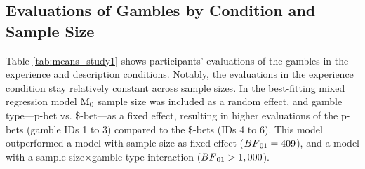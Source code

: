 \documentclass[a4paper, man, floatsintext]{apa6}
\title{}
\author{Jana B. Jarecki}
\date{02 Oktober, 2019}
\begin{document}
\subsection{Evaluations of Gambles by Condition and Sample Size}

Table \ref{tab:means_study1} shows participants' evaluations of the
gambles in the experience and description conditions. Notably, the
evaluations in the experience condition stay relatively constant across
sample sizes. In the best-fitting mixed regression model
\(\mathrm{M}\textsubscript{0}\) sample size was included as a random
effect, and gamble type---p-bet vs. \$-bet---as a fixed effect,
resulting in higher evaluations of the p-bets (gamble IDs 1 to 3)
compared to the \$-bets (IDs 4 to 6). This model outperformed a model
with sample size as fixed effect (\(BF\textsubscript{01} = 409\)), and a
model with a sample-size\(\times\)gamble-type interaction
(\(BF\textsubscript{01} > 1,000\)).
\end{document}
